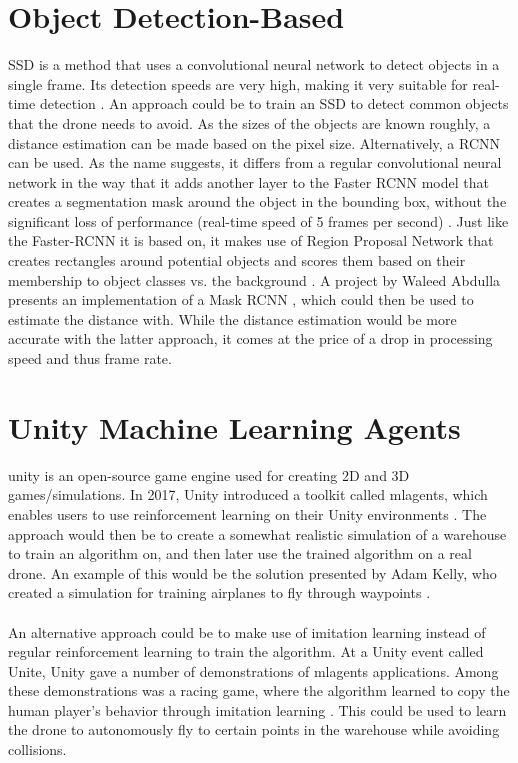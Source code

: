 \section{Object Detection-Based}
\label{sec:ssd_segmentation}
\gls{SSD} is a method that uses a convolutional neural network to detect objects in a single frame. Its detection speeds are very high, making it very suitable for real-time detection \citep{ssd}. An approach could be to train an \gls{SSD} to detect common objects that the drone needs to avoid. As the sizes of the objects are known roughly, a distance estimation can be made based on the pixel size. Alternatively, a \gls{RCNN} can be used. As the name suggests, it differs from a regular convolutional neural network in the way that it adds another layer to the Faster \gls{RCNN} model that creates a segmentation mask around the object in the bounding box, without the significant loss of performance (real-time speed of 5 frames per second) \citep{mask_cnn}. Just like the Faster-\gls{RCNN} it is based on, it makes use of Region Proposal Network that creates rectangles around potential objects and scores them based on their membership to object classes vs. the background \citep{faster_rcnn}. A project by Waleed Abdulla presents an implementation of a Mask \gls{RCNN} \citep{matterport}, which could then be used to estimate the distance with. While the distance estimation would be more accurate with the latter approach, it comes at the price of a drop in processing speed and thus frame rate.

\section{Unity Machine Learning Agents}
\label{sec:approach_ml_agents}
\gls{unity} is an open-source game engine used for creating 2D and 3D games/simulations. In 2017, Unity introduced a toolkit called \gls{mlagents}, which enables users to use reinforcement learning on their Unity environments \citep{mlagents_blog, mlagents_paper}. The approach would then be to create a somewhat realistic simulation of a warehouse to train an algorithm on, and then later use the trained algorithm on a real drone. An example of this would be the solution presented by Adam Kelly, who created a simulation for training airplanes to fly through waypoints \citep{ai_flight}.
\\\\
An alternative approach could be to make use of imitation learning instead of regular reinforcement learning to train the algorithm. At a Unity event called Unite, Unity gave a number of demonstrations of \gls{mlagents} applications. Among these demonstrations was a racing game, where the algorithm learned to copy the human player's behavior through imitation learning \citep{imitation_learning, mlagents_paper}. This could be used to learn the drone to autonomously fly to certain points in the warehouse while avoiding collisions.
